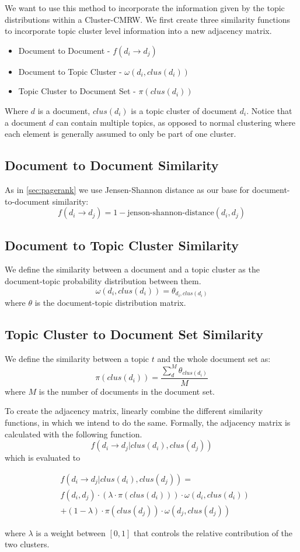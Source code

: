 We want to use this method to incorporate the information given by the topic distributions within a \gls{Cluster-CMRW}. 
We first create three similarity functions to incorporate topic cluster level information into a new adjacency matrix.
\begin{itemize}
    \item Document to Document - $f(d_i \rightarrow d_j)$
    \item Document to Topic Cluster - $\omega(d_i,clus(d_i))$
    \item Topic Cluster to Document Set - $\pi(clus(d_i))$
\end{itemize}

\noindent
Where $d$ is a document, $clus(d_i)$ is a topic cluster of document $d_i$.
Notice that a document $d$ can contain multiple topics, as opposed to normal clustering where each element is generally assumed to only be part of one cluster.

\subsection*{Document to Document Similarity}
As in \autoref{sec:pagerank} we use Jensen-Shannon distance as our base for document-to-document similarity:
$$ f(d_i \rightarrow d_j) = 1 - \text{jenson-shannon-distance}(d_i, d_j)$$ 

\subsection*{Document to Topic Cluster Similarity}
We define the similarity between a document and a topic cluster as the document-topic probability distribution between them.
$$ \omega(d_i,clus(d_i)) = \theta_{d_i,clus(d_i)}$$
where $\theta$ is the document-topic distribution matrix.

\subsection*{Topic Cluster to Document Set Similarity}
We define the similarity between a topic $t$ and the whole document set as:
$$ \pi(clus(d_i)) = \frac{\sum_{d}^{M} \theta_{clus(d_i)}}{M} $$
where $M$ is the number of documents in the document set.


To create the adjacency matrix, \cite{ClusterPageRank} linearly combine the different similarity functions, in which we intend to do the same.
Formally, the adjacency matrix is calculated with the following function.
$$ f(d_i \rightarrow d_j | clus(d_i), clus(d_j)) $$
which is evaluated to 

\begin{align*}
&f(d_i \rightarrow d_j | clus(d_i), clus(d_j)) = \\
&f(d_i, d_j) \cdot (\lambda \cdot \pi(clus(d_i))) \cdot \omega(d_i, clus(d_i)) \\ 
&+ (1-\lambda) \cdot \pi(clus(d_j)) \cdot \omega(d_j, clus(d_j))
\end{align*}

where $\lambda$ is a weight between $[0,1]$ that controls the relative contribution of the two clusters.
